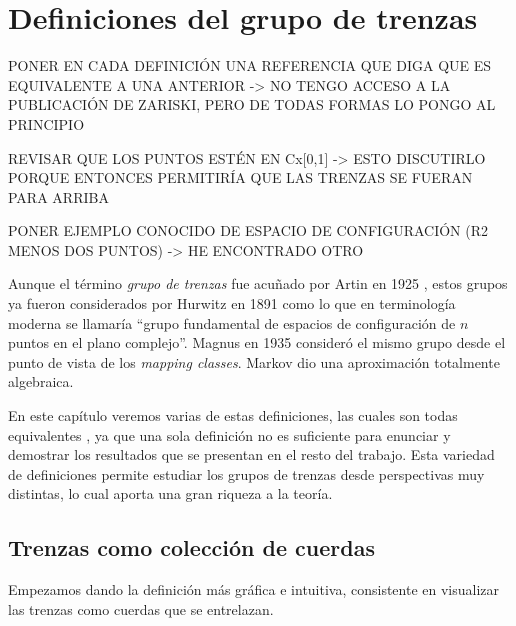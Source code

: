 \documentclass[TFG.tex]{subfiles}
\begin{document}
\chapter{Definiciones del grupo de trenzas}

PONER EN CADA DEFINICIÓN UNA REFERENCIA QUE DIGA QUE ES EQUIVALENTE A UNA ANTERIOR -> NO TENGO ACCESO A LA PUBLICACIÓN DE ZARISKI, PERO DE TODAS FORMAS LO PONGO AL PRINCIPIO 

REVISAR QUE LOS PUNTOS ESTÉN EN Cx[0,1] -> ESTO DISCUTIRLO PORQUE ENTONCES PERMITIRÍA QUE LAS TRENZAS SE FUERAN PARA ARRIBA

PONER EJEMPLO CONOCIDO DE ESPACIO DE CONFIGURACIÓN (R2 MENOS DOS PUNTOS) -> HE ENCONTRADO OTRO


Aunque el término \emph{grupo de trenzas} fue acuñado por Artin en 1925 \cite{ArtinA}, estos grupos ya fueron considerados por Hurwitz en 1891 \cite{Hur} como lo que en terminología moderna se llamaría ``grupo fundamental de espacios de configuración de $n$ puntos en el plano complejo''. Magnus en 1935 \cite{Magnus} consideró el mismo grupo desde el punto de vista de los \emph{mapping classes}. Markov \cite{Markoff} dio una aproximación totalmente algebraica. 

En este capítulo veremos varias de estas definiciones, las cuales son todas equivalentes \cite{Zariski}, ya que una sola definición no es suficiente para enunciar y demostrar los resultados que se presentan en el resto del trabajo. Esta variedad de definiciones permite estudiar los grupos de trenzas desde perspectivas muy distintas, lo cual aporta una gran riqueza a la teoría.

\section{Trenzas como colección de cuerdas}
Empezamos dando la definición más gráfica e intuitiva, consistente en visualizar las trenzas como cuerdas que se entrelazan. 
\end{document}
